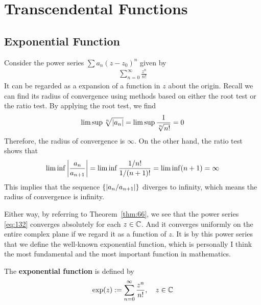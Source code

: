 \documentclass[thmcnt=section, 12pt]{my-elegantbook}
\begin{document}

\chapter{Transcendental Functions}


\section{Exponential Function}

Consider the power series $\sum a_n (z - z_0)^n$ given by  
\begin{align}
	\sum_{n=0}^\infty \frac{z^n}{n!}
	\label{eq:132}
\end{align}
It can be regarded as a expansion of a function in $z$ 
about the origin. 
Recall we can find its radius of convergence 
using methods based on 
either the root test or the ratio test.
By applying the root test, we find 
\begin{align*}
	\limsup \sqrt[n]{\left\lvert a_n \right\rvert}
	= \limsup \frac{1}{\sqrt[n]{n!}}
	= 0
\end{align*}
Therefore, the radius of convergence is $\infty$.
On the other hand, the ratio test shows that 
\begin{align*}
	\liminf \left\lvert \frac{a_n}{a_{n+1}} \right\rvert
	= \liminf \frac{1 / n!}{1 / (n+1)!}
	= \liminf (n+1) 
	= \infty
\end{align*}
This implies that the sequence 
$\{\left\lvert a_{n} /  a_{n+1} \right\rvert\}$ diverges to infinity, 
which means the radius of convergence is infinity.

Either way, by referring to Theorem~\ref{thm:66},
we see that the power series \eqref{eq:132}
converges absolutely for each $z \in \mathbb{C}$.
And it converges uniformly on the entire complex plane
if we regard it as a function of $z$.
It is by this power series that we define
the well-known exponential function,
which is personally I think the most fundamental
and the most important function in mathematics.

\begin{definition}\label{def:4}
	The \textbf{exponential function} 
	is defined by 
	\begin{align*}
		\exp(z) := \sum_{n=0}^\infty \frac{z^n}{n!},
		\quad z \in \mathbb{C} 
	\end{align*}
\end{definition}

\end{document}
